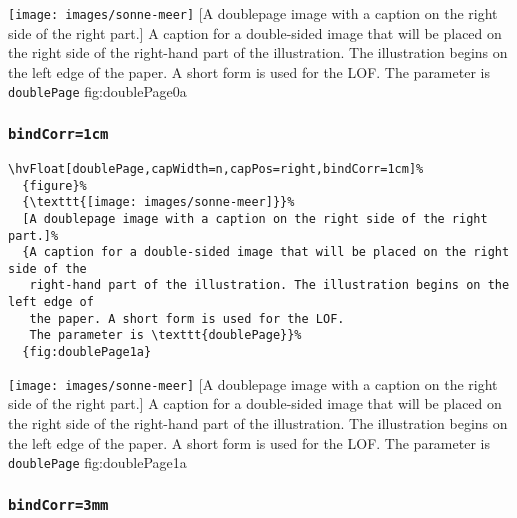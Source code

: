 \documentclass[twoside]{scrartcl}
\makeatletter
\let\hvBlindtext\Blindtext
\def\Blindtext{\par\color{black!40}\hvBlindtext\par\normalcolor}
\def\hvblindtext{\textcolor{black!40}{\blindtext@text}}
\makeatother
\begin{document}
%
  {\texttt{[image: images/sonne-meer]}}%
  [A doublepage image with a caption on the right side of the right part.]%
  {A caption for a double-sided image that will be placed on the right side of the
   right-hand part of the illustration. The illustration begins on the left edge of 
   the paper. A short form is used for the LOF. 
   The parameter is \texttt{doublePage}}%
  {fig:doublePage0a}

\Blindtext

\Blindtext

\Blindtext




\subsubsection{\texttt{bindCorr=1cm}}

\begin{lstlisting}
\hvFloat[doublePage,capWidth=n,capPos=right,bindCorr=1cm]%
  {figure}%
  {\texttt{[image: images/sonne-meer]}}%
  [A doublepage image with a caption on the right side of the right part.]%
  {A caption for a double-sided image that will be placed on the right side of the
   right-hand part of the illustration. The illustration begins on the left edge of 
   the paper. A short form is used for the LOF. 
   The parameter is \texttt{doublePage}}%
  {fig:doublePage1a}
\end{lstlisting}

%
  {\texttt{[image: images/sonne-meer]}}%
  [A doublepage image with a caption on the right side of the right part.]%
  {A caption for a double-sided image that will be placed on the right side of the
   right-hand part of the illustration. The illustration begins on the left edge of 
   the paper. A short form is used for the LOF. 
   The parameter is \texttt{doublePage}}%
  {fig:doublePage1a}

\hvblindtext

\Blindtext

\Blindtext

\Blindtext

\subsubsection{\texttt{bindCorr=3mm}}
\end{document}
